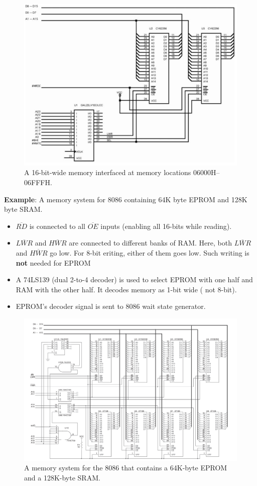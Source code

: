 \begin{figure}[h!]
  \includegraphics[width = 1.0\textwidth]{./figures/Separate_Bank.png}
  \caption{A 16-bit-wide memory interfaced at memory locations 06000H–06FFFH.}
  \label{}
\end{figure}

\textbf{Example}: A memory system for 8086 containing 64K byte EPROM and 128K byte SRAM.
\begin{itemize}
  \item $\overline{RD}$ is connected to all $\overline{OE}$ inputs (enabling all 16-bits while reading).
  \item $\overline{LWR}$ and $\overline{HWR}$ are connected to different banks of RAM. Here, both $\overline{LWR}$ and $\overline{HWR}$ go low. For 8-bit eriting, either of them goes low. Such writing is \textbf{not} needed for EPROM
  \item A 74LS139 (dual 2-to-4 decoder) is used to select EPROM with one half and RAM with the other half. It decodes memory as 1-bit wide ( not 8-bit).
  \item EPROM's decoder signal is sent to 8086 wait state generator.
\end{itemize}

\begin{figure}[h!]
  \includegraphics[width = 1.2\textwidth]{./figures/Memory_System.png}
  \caption{A memory system for the 8086 that contains a 64K-byte EPROM and a 128K-byte SRAM.}
  \label{}
\end{figure}
